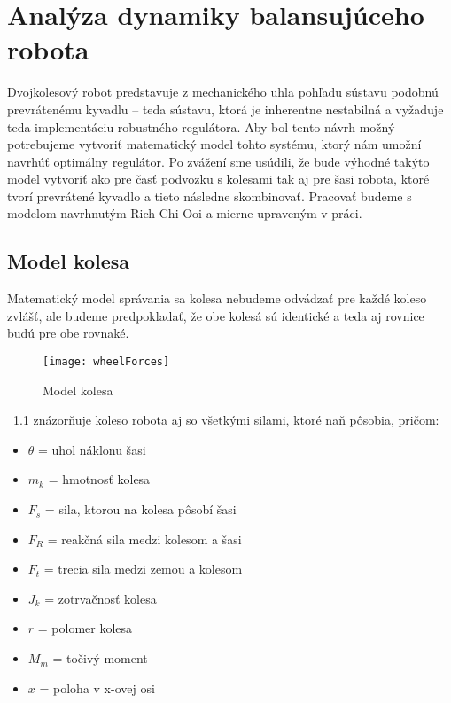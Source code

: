 \chapter{Analýza dynamiky balansujúceho robota}


Dvojkolesový robot predstavuje z mechanického uhla pohľadu sústavu podobnú prevrátenému kyvadlu – teda sústavu, ktorá je inherentne nestabilná a vyžaduje teda implementáciu robustného regulátora. Aby bol tento návrh možný potrebujeme vytvoriť matematický model tohto systému, ktorý nám umožní navrhúť optimálny regulátor. Po zvážení sme usúdili, že bude výhodné takýto model vytvoriť ako pre časť podvozku s kolesami tak aj pre šasi robota, ktoré tvorí prevrátené kyvadlo a tieto následne skombinovať.
Pracovať budeme s modelom navrhnutým Rich Chi Ooi \cite{Oochi2003} a mierne upraveným v práci\cite{TWIP}.

\section{Model kolesa}

Matematický model správania sa kolesa nebudeme odvádzať pre každé koleso zvlášť, ale budeme predpokladať, že obe kolesá sú identické a teda aj rovnice budú pre obe rovnaké.

\begin{figure}
\centering
\texttt{[image: wheelForces]}
\caption{Model kolesa}
\label{fig:wheelForces}
\end{figure}

\figurename~\ref{fig:wheelForces} znázorňuje koleso robota aj so všetkými silami, ktoré naň pôsobia, pričom:

\begin{multicols}{2}
\begin{itemize}
\item $\theta$ = uhol náklonu šasi
\item $m_k$ = hmotnosť kolesa 
\item $F_s$ = sila, ktorou na kolesa pôsobí šasi
\item $F_R$ = reakčná sila medzi kolesom a šasi
\item $F_t$ = trecia sila medzi zemou a kolesom
\item $J_k$ = zotrvačnosť kolesa
\item $r$ = polomer kolesa 
\item $M_m$ = točivý moment
\item $x$ = poloha v x-ovej osi
\end{itemize}
\end{multicols}

